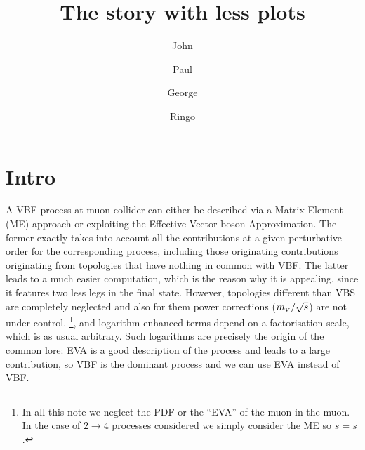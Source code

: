 \documentclass[a4paper,11pt]{article}
\title{The story with less plots}
\author[a]{John}
\author[a]{Paul}
\author[a]{George}
\author[a]{Ringo}
\affiliation[a]{Abbey Rd.~London, Regno Unito
}
\begin{document}
\maketitle
\flushbottom


\section{Intro}

A VBF process at muon collider can either be described via a Matrix-Element (ME) approach or exploiting the Effective-Vector-boson-Approximation. 
The former exactly takes into account all the contributions at a given perturbative order for the corresponding process, including those originating  contributions originating from  topologies that have nothing in common with VBF.  The latter leads to a much easier computation, which is the reason why it is appealing, since it features two less legs in the final state. However, topologies different than VBS are completely neglected and also for them 
power corrections ($m_{\scriptscriptstyle V}/\sqrt{s}$) are not under control. \footnote{In all this note we neglect the PDF or the ``EVA'' of the muon in the muon. In the case of $2\to 4$ processes considered we simply consider the ME so $\hat s= s$.}, and logarithm-enhanced terms depend on a factorisation scale, which is as usual arbitrary. Such logarithms are precisely the origin of the common lore: EVA is a good description of the process and leads to a large contribution, so VBF is the dominant process and we can use EVA instead of VBF.
\end{document}

